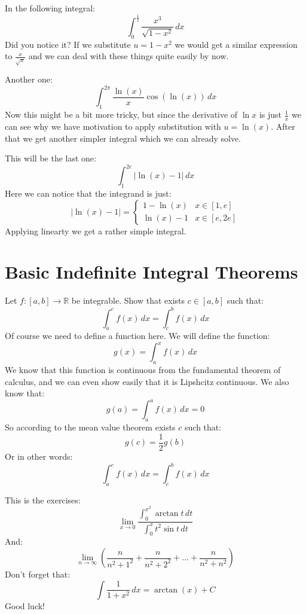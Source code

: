 \documentclass{article}
\theoremstyle{plain}
\newcommand{\R}{\mathbb{R}}
\begin{document}
	\newpage
	
	In the following integral:
	\[
		\int_{0}^{\frac 12}{\frac{x^3}{\sqrt{1-x^2}}\,dx}
	\]
	Did you notice it? If we substitute $u=1-x^2$ we would get a similar
	expression to $\frac{x}{\sqrt{x}}$ and we can deal with these things
	quite easily by now.
	
	\newpage
	
	Another one:
	\[
		\int_{1}^{2\pi}{\frac{\ln(x)}{x}\cos(\ln(x))\,dx}
	\]
	Now this might be a bit more tricky, but since the derivative of
	$\ln x$ is just $\frac{1}{x}$ we can see why we have motivation to apply
	substitution with $u = \ln(x)$. After that we get another simpler
	integral which we can already solve.
	
	\newpage
	
	This will be the last one:
	\[
		\int_{1}^{2e}{|\ln(x) - 1|\,dx}
	\]
	Here we can notice that the integrand is just:
	\[
		|\ln(x) - 1| = \begin{cases}
			1 - \ln(x) & x\in[1,e] \\
			\ln(x) - 1 & x\in[e,2e]
		\end{cases}
	\]
	Applying linearty we get a rather simple integral.
	
	\newpage
	
	\section{Basic Indefinite Integral Theorems}
	Let $f\colon [a,b]\to\R$ be integrable. Show that exists 
	$c\in [a,b]$ such that:
	\[
		\int_{a}^{c}{f(x)\,dx} = \int_{c}^{b}{f(x)\,dx}
	\]
	Of course we need to define a function here. We will define the
	function:
	\[
		g(x) = \int_{a}^{x}{f(x)\,dx}
	\]
	We know that this function is continuous from the fundamental theorem
	of calculus, and we can even show easily that it is Lipshcitz continuous.
	We also know that:
	\[
		g(a) = \int_{a}^{a}{f(x)\,dx} = 0
	\]
	So according to the mean value theorem exists $c$ such that:
	\[
		g(c) = \frac{1}{2}g(b)
	\]
	Or in other words:
	\[
		\int_{a}^{c}{f(x)\,dx} = \int_{c}^{b}{f(x)\,dx}
	\]
	
	\newpage
	
	This is the exercises:
	\[
		\lim_{x\to 0}{\frac{\int_{0}^{x^2}{\arctan t\,dt}}
		{\int_{0}^{x}{t^2\sin t\,dt}}}
	\]
	And:
	\[
		\lim_{n\to\infty}
		{\left(\frac{n}{n^2+1^2}+\frac{n}{n^2+2^2}+
		\dots+\frac{n}{n^2+n^2}\right)}	
	\]
	Don't forget that:
	\[
		\int{\frac{1}{1+x^2}\,dx} = \arctan(x) + C
	\]
	Good luck!
	
\end{document}
